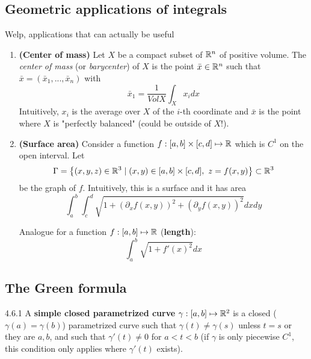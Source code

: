 \subsection{Geometric applications of integrals}

Welp, applications that can actually be useful

\begin{enumerate}
    \item \textbf{(Center of mass)} Let $X$ be a compact subset of $\mathbb{R}^n$ of positive volume. The \textit{center of mass} (or \textit{barycenter}) of
    $X$ is the point $\bar x \in \mathbb{R}^n$ such that $\bar x = (\bar x_1, ..., \bar x_n)$ with
    \[ \bar x_1 = \frac{1}{Vol{X}} \int_X x_i dx \]
    Intuitively, $x_i$ is the average over $X$ of the $i$-th coordinate and $\bar x$ is the point where $X$ is "perfectly balanced" (could be outside of $X$!).

    \item \textbf{(Surface area)} Consider a function $f: [a,b] \times [c,d] \mapsto \mathbb{R}$ which is $C^1$ on the open interval. Let
    \[ \Gamma = \left\{ (x,y,z) \in \mathbb{R}^3 \mid (x,y) \in [a,b] \times [c,d],\ z = f(x,y) \right\} \subset \mathbb{R}^3 \]
    be the graph of $f$. Intuitively, this is a surface and it has area
    \[ \int_a^b \int_c^d \sqrt{1 + (\partial_x f(x,y))^2 + (\partial_y f(x,y))^2}dxdy \]

    Analogue for a function $f: [a,b] \mapsto \mathbb{R}$ (\textbf{length}):
    \[ \int_a^b \sqrt{1 + f'(x)^2}dx \]
\end{enumerate}


\subsection{The Green formula}

\begin{definition}{4.6.1}
    A \textbf{simple closed parametrized curve} $\gamma: [a,b] \mapsto \mathbb{R}^2$ is a closed ($\gamma(a) = \gamma(b)$) parametrized
    curve such that $\gamma(t) \ne \gamma(s)$ unless $t = s$ or they are $a,b$, and such
    that $\gamma'(t) \ne 0$ for $a < t < b$ (if $\gamma$ is only piecewise $C^1$, this condition only applies where $\gamma'(t)$ exists).
\end{definition}


